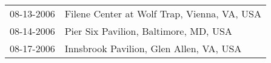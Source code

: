 \begin{supertabular}{ll}
 08-13-2006 &  Filene Center at Wolf Trap, Vienna, VA, USA \\
 08-14-2006 &        Pier Six Pavilion, Baltimore, MD, USA \\
 08-17-2006 &      Innsbrook Pavilion, Glen Allen, VA, USA \\
\end{supertabular}
